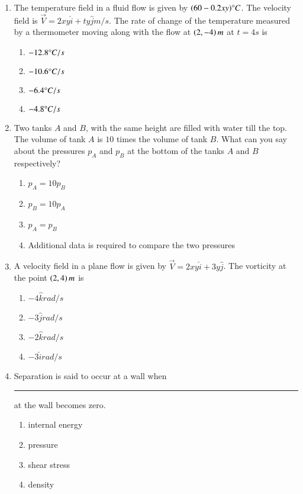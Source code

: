 \documentclass[journal]{IEEEtran}
\begin{document}
\begin{enumerate}
\item The temperature field in a fluid flow is given by $(60-0.2xy)\degree C$. The velocity field is $\overrightarrow{V}=2xy\hat{i}+ty\hat{j}m/s$. The rate of change of the temperature measured by a thermometer moving along with the flow at $\left(2,-4\right)m$ at $t=4s$ is
\begin{multicols}{2}
\begin{enumerate}
\item $-12.8\degree C/s$
\item $-10.6\degree C/s$
\item $-6.4\degree C/s$
\item $-4.8\degree C/s$
\end{enumerate}
\end{multicols}


\item Two tanks $A$ and $B$, with the same height are filled with water till the top. The volume of tank $A$ is $10$ times the volume of tank $B$. What can you say about the pressures $p_{A}$ and $p_{B}$ at the bottom of the tanks $A$ and $B$ respectively?
\begin{enumerate}
\item $p_{A}=10p_{B}$
\item $p_{B}=10p_{A}$
\item $p_{A}=p_{B}$
\item Additional data is required to compare the two pressures
\end{enumerate}


\item A velocity field in a plane flow is given by $\overrightarrow{V}=2xy\hat{i}+3y\hat{j}$. The vorticity at the point $\left(2,4\right)m$ is
\begin{multicols}{2}
\begin{enumerate}
\item $-4\hat{k}rad/s$
\item $-3\hat{j}rad/s$
\item $-2\hat{k}rad/s$
\item $-3\hat{i}rad/s$
\end{enumerate}
\end{multicols}


\item Separation is said to occur at a wall when \rule{1cm}{0.15mm} at the wall becomes zero.
\begin{multicols}{2}
\begin{enumerate}
\item internal energy
\item pressure
\item shear stress
\item density
\end{enumerate}
\end{multicols}
\end{enumerate}
\end{document}
